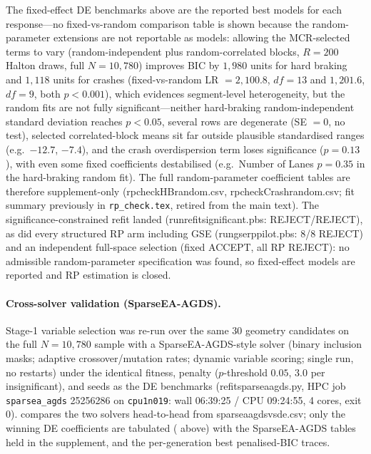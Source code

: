 \documentclass[letterpaper,8pt]{extarticle}  %
\newcommand{\file}[1]{{\ttfamily\def\_{\textunderscore\allowbreak}#1}}
\begin{document}
\begin{doublespacing}
\begin{linenumbers}
The fixed-effect DE benchmarks above are the reported best models for each response---no fixed-vs-random comparison table is shown because the random-parameter extensions are not reportable as models: allowing the MCR-selected terms to vary (random-independent plus random-correlated blocks, $R=200$ Halton draws, full $N=10{,}780$) improves BIC by $1{,}980$ units for hard braking and $1{,}118$ units for crashes (fixed-vs-random LR $=2{,}100.8$, $df=13$ and $1{,}201.6$, $df=9$, both $p<0.001$), which evidences segment-level heterogeneity, but the random fits are not fully significant---neither hard-braking random-independent standard deviation reaches $p<0.05$, several rows are degenerate (SE $=0$, no test), selected correlated-block means sit far outside plausible standardised ranges (e.g.\ $-12.7$, $-7.4$), and the crash overdispersion term loses significance ($p=0.13$), with even some fixed coefficients destabilised (e.g.\ Number of Lanes $p=0.35$ in the hard-braking random fit). The full random-parameter coefficient tables are therefore supplement-only (\file{rp\_check\_HB\_random.csv}, \file{rp\_check\_Crash\_random.csv}; fit summary previously in \texttt{rp\_check.tex}, retired from the main text). The significance-constrained refit landed (\file{run\_refit\_significant.pbs}: REJECT/REJECT), as did every structured RP arm including GSE (\file{run\_gse\_rp\_pilot.pbs}: 8/8 REJECT) and an independent full-space selection (fixed ACCEPT, all RP REJECT): no admissible random-parameter specification was found, so fixed-effect models are reported and RP estimation is closed.

\FloatBarrier


\paragraph{Cross-solver validation (SparseEA-AGDS).} Stage-1 variable selection was re-run over the same 30 geometry candidates on the full $N=10{,}780$ sample with a SparseEA-AGDS-style solver (binary inclusion masks; adaptive crossover/mutation rates; dynamic variable scoring; single run, no restarts) under the identical fitness, penalty ($p$-threshold $0.05$, $3.0$ per insignificant), and seeds as the DE benchmarks (\file{refit\_sparsea\_agds.py}, HPC job \texttt{sparsea\_agds} 25256286 on \texttt{cpu1n019}: wall 06:39:25 / CPU 09:24:55, 4 cores, exit 0).  compares the two solvers head-to-head from \file{sparseaagds\_vs\_de.csv}; only the winning DE coefficients are tabulated ( above) with the SparseEA-AGDS tables held in the supplement, and  the per-generation best penalised-BIC traces.


\end{linenumbers}
\end{doublespacing}
\end{document}
